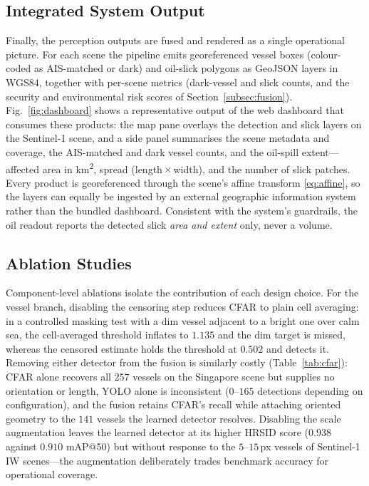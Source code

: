 \documentclass{ieeeaccess}
\begin{document}
\subsection{Integrated System Output}

Finally, the perception outputs are fused and rendered as a single operational picture. For each scene the pipeline emits georeferenced vessel boxes (colour-coded as AIS-matched or dark) and oil-slick polygons as GeoJSON layers in WGS84, together with per-scene metrics (dark-vessel and slick counts, and the security and environmental risk scores of Section~\ref{subsec:fusion}). Fig.~\ref{fig:dashboard} shows a representative output of the web dashboard that consumes these products: the map pane overlays the detection and slick layers on the Sentinel-1 scene, and a side panel summarises the scene metadata and coverage, the AIS-matched and dark vessel counts, and the oil-spill extent---affected area in km\textsuperscript{2}, spread (length\,$\times$\,width), and the number of slick patches. Every product is georeferenced through the scene's affine transform \eqref{eq:affine}, so the layers can equally be ingested by an external geographic information system rather than the bundled dashboard. Consistent with the system's guardrails, the oil readout reports the detected slick \emph{area and extent} only, never a volume.

\subsection{Ablation Studies}
\label{subsec:ablation}

Component-level ablations isolate the contribution of each design choice. For the vessel branch, disabling the censoring step reduces CFAR to plain cell averaging: in a controlled masking test with a dim vessel adjacent to a bright one over calm sea, the cell-averaged threshold inflates to $1.135$ and the dim target is missed, whereas the censored estimate holds the threshold at $0.502$ and detects it. Removing either detector from the fusion is similarly costly (Table~\ref{tab:cfar}): CFAR alone recovers all $257$ vessels on the Singapore scene but supplies no orientation or length, YOLO alone is inconsistent ($0$--$165$ detections depending on configuration), and the fusion retains CFAR's recall while attaching oriented geometry to the $141$ vessels the learned detector resolves. Disabling the scale augmentation leaves the learned detector at its higher HRSID score ($0.938$ against $0.910$ mAP@50) but without response to the $5$--$15$\,px vessels of Sentinel-1 IW scenes---the augmentation deliberately trades benchmark accuracy for operational coverage.
\end{document}
